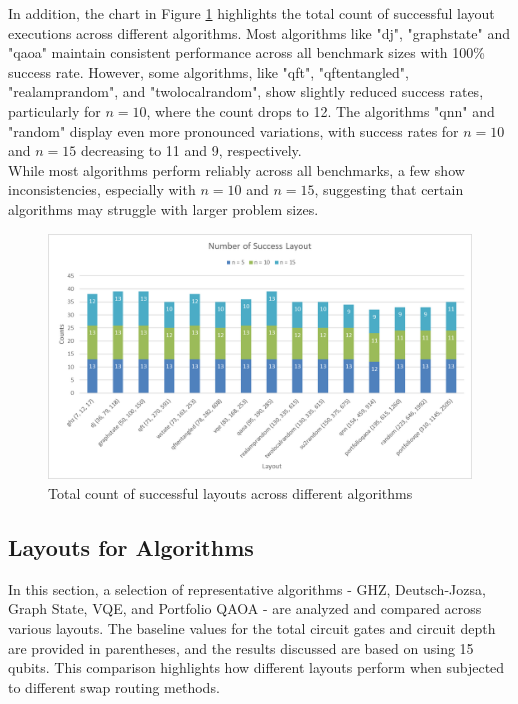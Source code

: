 In addition, the chart in Figure \ref{fig:chart-success-layout-run} highlights the total count of successful layout executions across different algorithms. Most algorithms like "dj", "graphstate" and "qaoa" maintain consistent performance across all benchmark sizes with 100\% success rate. However, some algorithms, like "qft", "qftentangled", "realamprandom", and "twolocalrandom", show slightly reduced success rates, particularly for $n = 10$, where the count drops to 12. The algorithms "qnn" and "random" display even more pronounced variations, with success rates for $n = 10$ and $n = 15$ decreasing to 11 and 9, respectively. \\
While most algorithms perform reliably across all benchmarks, a few show inconsistencies, especially with $n = 10$ and $n = 15$, suggesting that certain algorithms may struggle with larger problem sizes.
\begin{figure}[htb]
    \centering
    \includegraphics[width=0.8\linewidth]{image/chart_success_layout_run.png}
    \caption{Total count of successful layouts across different algorithms}
    \label{fig:chart-success-layout-run}
\end{figure}
\FloatBarrier

\subsection{Layouts for Algorithms}
In this section, a selection of representative algorithms - GHZ, Deutsch-Jozsa, Graph State, VQE, and Portfolio QAOA - are analyzed and compared across various layouts. The baseline values for the total circuit gates and circuit depth are provided in parentheses, and the results discussed are based on using 15 qubits. This comparison highlights how different layouts perform when subjected to different swap routing methods.

